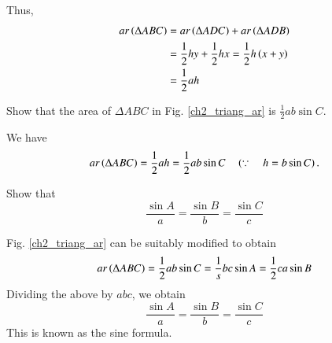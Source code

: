 Thus,
\begin{align}
ar\left(\Delta ABC\right) &= ar\left(\Delta ADC\right) + ar\left(\Delta ADB\right) \\
&= \frac{1}{2}hy + \frac{1}{2}hx = \frac{1}{2}h\left(x+y\right) \\
&= \frac{1}{2}ah
\end{align}
\begin{problem}
	Show that the area of $\Delta ABC$ in Fig. 	\ref{ch2_triang_ar}	is $\frac{1}{2}ab \sin C$.
\end{problem}
\proof We have
%
\begin{equation}
ar\left(\Delta ABC\right) = \frac{1}{2}ah = \frac{1}{2}ab\sin C \quad \left(\because \quad h = b \sin C\right).
\end{equation}
%
\begin{problem}
	Show that 
	\begin{equation}
	\frac{\sin A}{a} = \frac{\sin B}{b} = \frac{\sin C}{c}
	\end{equation}
\end{problem}
\proof Fig. \ref{ch2_triang_ar} can be suitably modified to obtain 
\begin{equation}
ar\left(\Delta ABC\right) = \frac{1}{2}ab\sin C = \frac{1}{s}bc\sin A = \frac{1}{2}ca\sin B
\end{equation}
Dividing the above by $abc$, we obtain
	\begin{equation}
	\frac{\sin A}{a} = \frac{\sin B}{b} = \frac{\sin C}{c}
	\end{equation}
This is known as the sine formula.	
%
